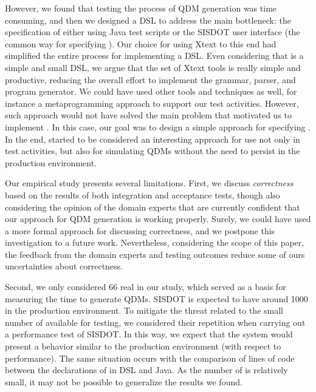 However, we found that testing the process of QDM generation was
time consuming, and then we designed a DSL to address the main
bottleneck: the specification of \callers either using Java test scripts
or the SISDOT user interface (the common way for specifying \callers). Our choice
for using Xtext to this end had simplified the entire process for
implementing a DSL. Even considering that \hlrdsl is a simple and
small DSL, we argue that the set of Xtext tools is really simple and productive,
reducing the overall effort to implement the \hlrdsl grammar, parser, and
program generator. We could have used other tools and techniques as well, for instance
a metaprogramming approach to support our test activities. However,
such approach would not have solved the main problem that motivated us
to implement \hlrdsl. In this case, our goal was to design a simple
approach for specifying \callers. In the end, \hlrdsl started to
be considered an interesting approach for use not only in test
activities, but also for simulating QDMs without the need
to persist \callers in the production environment. 




Our empirical study presents several limitations. First, we discuss
\emph{correctness} based on the results of both integration and acceptance
tests, though also considering the opinion of the domain experts that are
currently confident that our approach for QDM generation is working
properly. Surely, we could have used a more formal approach for
discussing correctness, and we postpone this investigation to a future
work. Nevertheless, considering the scope of this paper, the feedback
from the domain experts and testing outcomes reduce some of ours
uncertainties about correctness. 


Second, we only considered 66 real \callers in our study, which served as a basis
for measuring the time to generate QDMs. SISDOT is expected to have around 1000
\callers in the production environment. To mitigate the threat 
related to the small number of available \callers for testing, we considered their repetition
when carrying out a performance test of SISDOT. In this way, we expect that the
system would present a behavior similar to the production environment (with respect to performance).
The same situation occurs with the comparison of lines of code between the declarations
of \callers in DSL and Java. As the number of \callers is relatively small, 
it may not be possible to generalize the results we found.
